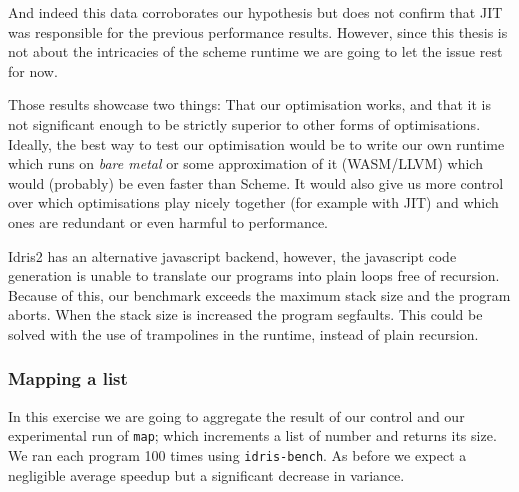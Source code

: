 \documentclass[
]{article}
\begin{document}
And indeed this data corroborates our hypothesis but does not confirm
that JIT was responsible for the previous performance results. However,
since this thesis is not about the intricacies of the scheme runtime we
are going to let the issue rest for now.

Those results showcase two things: That our optimisation works, and that
it is not significant enough to be strictly superior to other forms of
optimisations. Ideally, the best way to test our optimisation would be
to write our own runtime which runs on \emph{bare metal} or some
approximation of it (WASM/LLVM) which would (probably) be even faster
than Scheme. It would also give us more control over which optimisations
play nicely together (for example with JIT) and which ones are redundant
or even harmful to performance.

Idris2 has an alternative javascript backend, however, the javascript
code generation is unable to translate our programs into plain loops
free of recursion. Because of this, our benchmark exceeds the maximum
stack size and the program aborts. When the stack size is increased the
program segfaults. This could be solved with the use of trampolines in
the runtime, instead of plain recursion.

\hypertarget{mapping-a-list}{%
\subsubsection{Mapping a list}\label{mapping-a-list}}

In this exercise we are going to aggregate the result of our control and
our experimental run of \texttt{map}; which increments a list of number
and returns its size. We ran each program 100 times using
\texttt{idris-bench}. As before we expect a negligible average speedup
but a significant decrease in variance.
\end{document}

